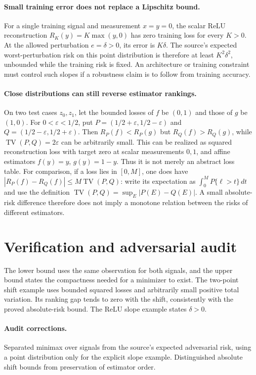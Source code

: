 \documentclass[11pt]{article}
\begin{document}
\paragraph{Small training error does not replace a Lipschitz bound.}
For a single training signal and measurement $x=y=0$, the scalar ReLU
reconstruction $R_K(y)=K\max(y,0)$ has zero training loss for every $K>0$.
At the allowed perturbation $e=\delta>0$, its error is $K\delta$.
The source's expected worst-perturbation risk on this point distribution is
therefore at least $K^2\delta^2$, unbounded while the training risk is fixed.
An architecture or training constraint must control such slopes if a robustness
claim is to follow from training accuracy.

\paragraph{Close distributions can still reverse estimator rankings.}
On two test cases $z_0,z_1$, let the bounded losses of $f$ be $(0,1)$ and
those of $g$ be $(1,0)$. For $0<\varepsilon<1/2$, put
$P=(1/2+\varepsilon,1/2-\varepsilon)$ and
$Q=(1/2-\varepsilon,1/2+\varepsilon)$.
Then $R_P(f)<R_P(g)$ but $R_Q(f)>R_Q(g)$, while
$\operatorname{TV}(P,Q)=2\varepsilon$ can be arbitrarily small.
This can be realized as squared reconstruction loss with target zero at scalar
measurements $0,1$, and affine estimators $f(y)=y$, $g(y)=1-y$.
Thus it is not merely an abstract loss table.
For comparison, if a loss lies in $[0,M]$, one does have
$|R_P(f)-R_Q(f)|\leq M\operatorname{TV}(P,Q)$:
write its expectation as $\int_0^M P\{\ell>t\}\,dt$ and use the definition
$\operatorname{TV}(P,Q)=\sup_E|P(E)-Q(E)|$.
A small absolute-risk difference therefore does not imply a monotone relation
between the risks of different estimators.

\section{Verification and adversarial audit}

The lower bound uses the same observation for both signals, and the upper bound
states the compactness needed for a minimizer to exist. The two-point shift
example uses bounded squared losses and arbitrarily small positive total
variation. Its ranking gap tends to zero with the shift, consistently with the
proved absolute-risk bound. The ReLU slope example states $\delta>0$.

\paragraph{Audit corrections.} Separated minimax over signals from the source's expected adversarial
risk, using a point distribution only for the explicit slope example. Distinguished
absolute shift bounds from preservation of estimator order.
\end{document}
